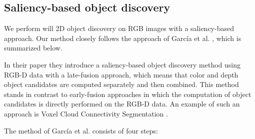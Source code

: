 \documentclass[a4paper,11pt,english]{article}
\begin{document}
\subsection{Saliency-based object discovery}
\label{background:saliencyobjectdiscovery}
We perform will 2D object discovery on RGB images with a saliency-based approach.
Our method closely follows the approach of García et al. \cite{garcia2015saliency}, which is summarized below.

In their paper they introduce a saliency-based object discovery method using RGB-D data with a late-fusion approach, which means that color and depth object candidates are computed separately and then combined.
This method stands in contrast to early-fusion approaches in which the computation of object candidates is directly performed on the RGB-D data.
An example of such an approach is Voxel Cloud Connectivity Segmentation \cite{papon2013voxel}. 

The method of García et al. consists of four steps:
\end{document}
